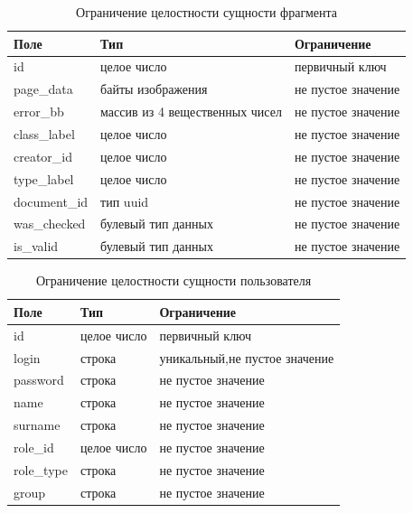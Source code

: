 \begin{table}[H]
	 \centering
	 \caption{Ограничение целостности сущности фрагмента}
	\begin{tabularx}{\textwidth}{|X|X|X|}
		\hline
		Поле & Тип & Ограничение \\
		\hline
		id & целое число & первичный ключ \\
		\hline
		page\_data & байты изображения & не пустое значение\\
		\hline
		error\_bb & массив из 4 вещественных чисел & не пустое значение\\
		\hline
		class\_label & целое число & не пустое значение\\
		\hline
		creator\_id & целое число & не пустое значение\\
		\hline
		type\_label & целое число & не пустое значение\\
		\hline
		document\_id & тип uuid &  не пустое значение\\
		\hline
		was\_checked & булевый тип данных & не пустое значение\\
		\hline
		is\_valid & булевый тип данных & не пустое значение\\
		\hline
	\end{tabularx}
	\label{t:markups}
\end{table}




\begin{table}[H]
	\centering
	\caption{Ограничение целостности сущности пользователя}
	\begin{tabularx}{\textwidth}{|X|X|X|}
	\hline
	Поле & Тип & Ограничение \\
	\hline
	id & целое число & первичный ключ\\
	\hline
	login & строка & уникальный,не пустое значение\\
	\hline
	password & строка & не пустое значение\\
	\hline
	name & строка & не пустое значение\\
	\hline
	surname & строка & не пустое значение\\
	\hline
	role\_id & целое число & не пустое значение\\
	\hline
	role\_type & строка & не пустое значение\\
	\hline
	group & строка & не пустое значение\\
	\hline
	\end{tabularx}
	\label{t:users_cons}
\end{table}


